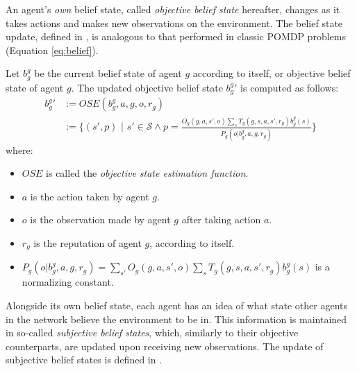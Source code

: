 An agent's \textit{own} belief state, called \textit{objective belief state} hereafter, changes as it takes actions and makes new observations on the environment. The belief state update, defined in , is analogous to that performed in classic POMDP problems (Equation \ref{eq:belief}).
\begin{definition}
\label{def:ose}
Let $b_g^g$ be the current belief state of agent $g$ according to itself, or objective belief state of agent $g$. The updated objective belief state ${b_g^g}'$ is computed as follows:
\begin{align*}
    {b_g^g}' 
    &:= OSE(b_g^g, a, g, o, r_g) \\
    &:= \Bigg\{(s', p) \,\,\Bigg| \,\,s'\in \mathcal{S} \land p = \frac{ O_g(g,a,s',o) \sum_{s} T_g(g,s,a,s', r_g)b_g^g(s)}{P_g(o | b_g^g,a,g,r_g)} \Bigg\}
\end{align*}
where:
\begin{itemize}
    \item $OSE$ is called the \textit{objective state estimation function}.
    \item $a$ is the action taken by agent $g$.
    \item $o$ is the observation made by agent $g$ after taking action $a$.
    \item $r_g$ is the reputation of agent $g$, according to itself.
    \item $P_g(o | b_g^g,a,g,r_g) = \sum_{s'} O_g(g,a,s',o) \sum_{s} T_g(g,s,a,s', r_g)b_g^g(s)$ is a normalizing constant.
\end{itemize}
\end{definition}
Alongside its own belief state, each agent has an idea of what state other agents in the network believe the environment to be in. This information is maintained in so-called \textit{subjective belief states}, which, similarly to their objective counterparts, are updated upon receiving new observations. The update of subjective belief states is defined in .
